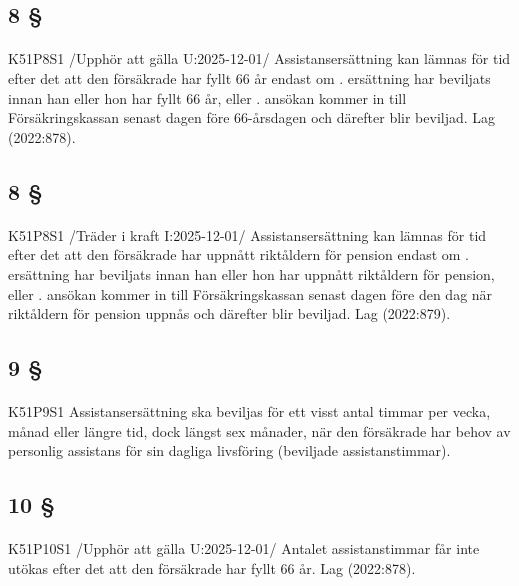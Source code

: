 \documentclass[a4paper,notitlepage,openany,10pt]{book}
\begin{document}
\subsection*{8 §}
\paragraph*{}
{\tiny K51P8S1}
/Upphör att gälla U:2025-12-01/
Assistansersättning kan lämnas för tid efter det att den försäkrade har fyllt 66 år endast om
. ersättning har beviljats innan han eller hon har fyllt 66 år, eller
. ansökan kommer in till Försäkringskassan senast dagen före 66-årsdagen och därefter blir beviljad.
Lag (2022:878).
\subsection*{8 §}
\paragraph*{}
{\tiny K51P8S1}
/Träder i kraft I:2025-12-01/
Assistansersättning kan lämnas för tid efter det att den försäkrade har uppnått riktåldern för pension endast om
. ersättning har beviljats innan han eller hon har uppnått riktåldern för pension, eller
. ansökan kommer in till Försäkringskassan senast dagen före den dag när riktåldern för pension uppnås och därefter blir beviljad.
Lag (2022:879).
\subsection*{9 §}
\paragraph*{}
{\tiny K51P9S1}
Assistansersättning ska beviljas för ett visst antal timmar per vecka, månad eller längre tid, dock längst sex månader, när den försäkrade har behov av personlig assistans för sin dagliga livsföring (beviljade assistanstimmar).
\subsection*{10 §}
\paragraph*{}
{\tiny K51P10S1}
/Upphör att gälla U:2025-12-01/
Antalet assistanstimmar får inte utökas efter det att den försäkrade har fyllt 66 år.
Lag (2022:878).
\end{document}
